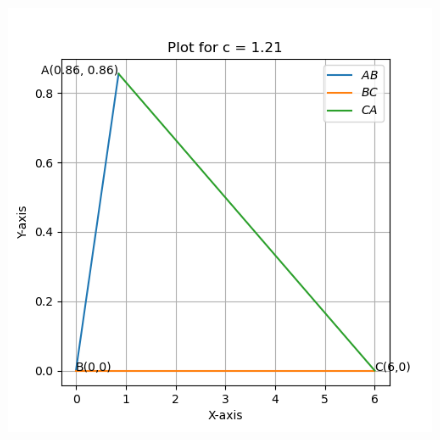 \documentclass[journal]{IEEEtran}
\begin{document}
\begin{figure}[h]
	\centering
	\includegraphics[scale=0.6]{figs/plot_triangle_3.png}
	\label{Fig}
\end{figure}
\end{document}

